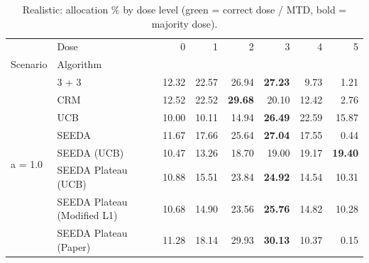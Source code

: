 \begin{table}[H]
\centering
\caption{Realistic: allocation \% by dose level (green = correct dose / MTD, bold = majority dose).}
\label{tab:real_alloc_by_dose}
\begin{tabular}{llrrrrrr}
\toprule
 & Dose & 0 & 1 & 2 & 3 & 4 & 5 \\
Scenario & Algorithm &  &  &  &  &  &  \\
\midrule
\multirow[c]{8}{*}{a = 1.0} & 3 + 3 & 12.32 & 22.57 & {\cellcolor[HTML]{C8E6C9}} 26.94 & \bfseries 27.23 & 9.73 & 1.21 \\
 & CRM & 12.52 & 22.52 & {\cellcolor[HTML]{C8E6C9}} \bfseries 29.68 & 20.10 & 12.42 & 2.76 \\
 & UCB & 10.00 & 10.11 & {\cellcolor[HTML]{C8E6C9}} 14.94 & \bfseries 26.49 & 22.59 & 15.87 \\
 & SEEDA & 11.67 & 17.66 & {\cellcolor[HTML]{C8E6C9}} 25.64 & \bfseries 27.04 & 17.55 & 0.44 \\
 & SEEDA (UCB) & 10.47 & 13.26 & {\cellcolor[HTML]{C8E6C9}} 18.70 & 19.00 & 19.17 & \bfseries 19.40 \\
 & SEEDA Plateau (UCB) & 10.88 & 15.51 & {\cellcolor[HTML]{C8E6C9}} 23.84 & \bfseries 24.92 & 14.54 & 10.31 \\
 & SEEDA Plateau (Modified L1) & 10.68 & 14.90 & {\cellcolor[HTML]{C8E6C9}} 23.56 & \bfseries 25.76 & 14.82 & 10.28 \\
 & SEEDA Plateau (Paper) & 11.28 & 18.14 & {\cellcolor[HTML]{C8E6C9}} 29.93 & \bfseries 30.13 & 10.37 & 0.15 \\
\bottomrule
\end{tabular}
\end{table}
